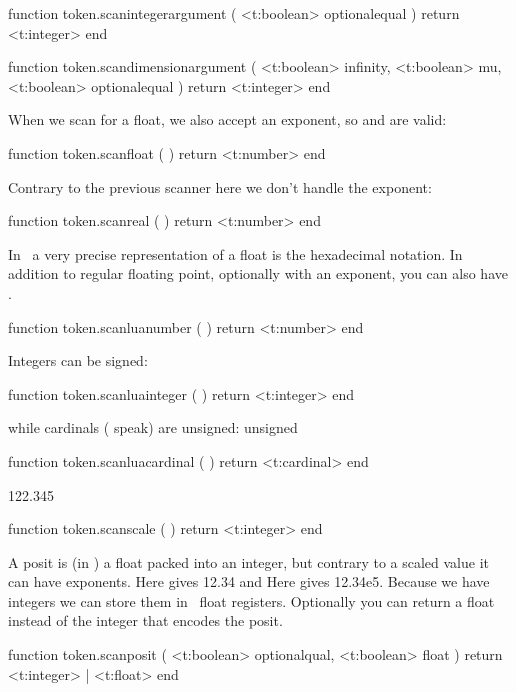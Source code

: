 \starttyping[option=LUA]
function token.scanintegerargument ( <t:boolean> optionalequal )
    return <t:integer>
end

function token.scandimensionargument (
    <t:boolean> infinity,
    <t:boolean> mu,
    <t:boolean> optionalequal
)
    return <t:integer>
end
\stoptyping

When we scan for a float, we also accept an exponent, so  and
 are valid:


\starttyping[option=LUA]
function token.scanfloat ( )
    return <t:number>
end
\stoptyping

Contrary to the previous scanner here we don't handle the exponent:

\starttyping[option=LUA]
function token.scanreal ( )
    return <t:number>
end
\stoptyping

In \LUA\ a very precise representation of a float is the hexadecimal notation. In
addition to regular floating point, optionally with an exponent, you can also
have .


\starttyping[option=LUA]
function token.scanluanumber ( )
    return <t:number>
end
\stoptyping

Integers can be signed:

\starttyping[option=LUA]
function token.scanluainteger ( )
    return <t:integer>
end
\stoptyping

while cardinals ( speak) are unsigned:
unsigned

\starttyping[option=LUA]
function token.scanluacardinal ( )
    return <t:cardinal>
end
\stoptyping

 122.345

\starttyping[option=LUA]
function token.scanscale ( )
    return <t:integer>
end
\stoptyping

A posit is (in \LUAMETATEX) a float packed into an integer, but contrary to a
scaled value it can have exponents. Here  gives {\tttf
{} 12.34} and Here  gives {\tttf
{}12.34e5}. Because we have integers we can store
them in \LUAMETATEX\ float registers. Optionally you can return a float instead
of the integer that encodes the posit.

\starttyping[option=LUA]
function token.scanposit (
    <t:boolean> optionalqual,
    <t:boolean> float
)
    return <t:integer> | <t:float>
end
\stoptyping

